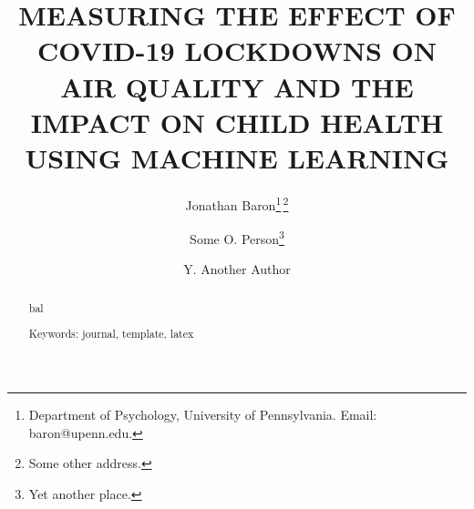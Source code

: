 \documentclass[9pt,twocolumn]{article}
\begin{document}
\sloppy
\title{\large{\uppercase{\textbf{
Measuring the effect of COVID-19 lockdowns on\\
air quality and the impact on child health\\
using machine learning
}}}}

\author{
Jonathan Baron\thanks{Department of Psychology, University of
  Pennsylvania. Email: baron@upenn.edu.}\;\,\thanks{Some other address.}
\and 
  Some O. Person\thanks{Yet another place.} 
\and
  Y. Another Author\footnotemark[2] %
}

\date{} %
\maketitle

\begin{abstract}

bal\smallskip
\noindent

Keywords: journal, template, latex

\end{abstract}

%
%





\end{document}
